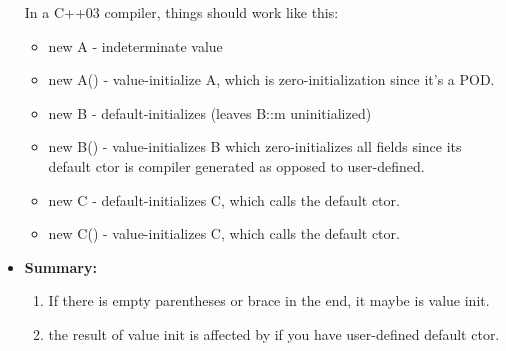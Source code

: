 \documentclass[a4paper,11pt,twoside]{book}
\begin{document}
\begin{itemize}
	In a C++03 compiler, things should work like this:
	\begin{itemize}
		\item new A - indeterminate value
		\item new A() - value-initialize A, which is zero-initialization since it's a POD.
		
		\item new B - default-initializes (leaves B::m uninitialized)
		
		\item new B() - value-initializes B which zero-initializes all fields since its default ctor is compiler generated as opposed to user-defined.
		
		\item new C - default-initializes C, which calls the default ctor.
		
		\item new C() - value-initializes C, which calls the default ctor.
	\end{itemize}
\item \textbf{Summary:} 
\begin{enumerate}
	\item If there is empty parentheses or brace in the end, it maybe is value init.
	\item the result of value init is affected by if you have user-defined default ctor.
\end{enumerate}
\end{itemize}
\end{document}

